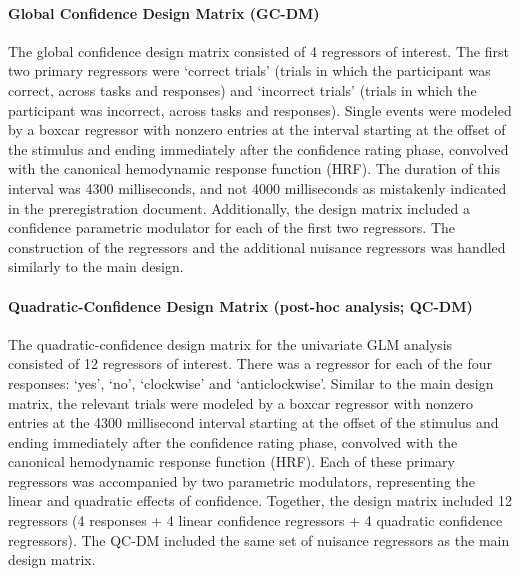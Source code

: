 \documentclass[12pt,twoside]{reedthesis}
\begin{document}
\hypertarget{global-confidence-design-matrix-gc-dm}{%
\paragraph{Global Confidence Design Matrix (GC-DM)}\label{global-confidence-design-matrix-gc-dm}}

The global confidence design matrix consisted of 4 regressors of interest. The first two primary regressors were `correct trials' (trials in which the participant was correct, across tasks and responses) and `incorrect trials' (trials in which the participant was incorrect, across tasks and responses). Single events were modeled by a boxcar regressor with nonzero entries at the interval starting at the offset of the stimulus and ending immediately after the confidence rating phase, convolved with the canonical hemodynamic response function (HRF). The duration of this interval was 4300 milliseconds, and not 4000 milliseconds as mistakenly indicated in the preregistration document. Additionally, the design matrix included a confidence parametric modulator for each of the first two regressors. The construction of the regressors and the additional nuisance regressors was handled similarly to the main design.

\hypertarget{QC-DM}{%
\paragraph{Quadratic-Confidence Design Matrix (post-hoc analysis; QC-DM)}\label{QC-DM}}

The quadratic-confidence design matrix for the univariate GLM analysis consisted of 12 regressors of interest. There was a regressor for each of the four responses: `yes', `no', `clockwise' and `anticlockwise'. Similar to the main design matrix, the relevant trials were modeled by a boxcar regressor with nonzero entries at the 4300 millisecond interval starting at the offset of the stimulus and ending immediately after the confidence rating phase, convolved with the canonical hemodynamic response function (HRF).
Each of these primary regressors was accompanied by two parametric modulators, representing the linear and quadratic effects of confidence. Together, the design matrix included 12 regressors (4 responses + 4 linear confidence regressors + 4 quadratic confidence regressors). The QC-DM included the same set of nuisance regressors as the main design matrix.
\end{document}
